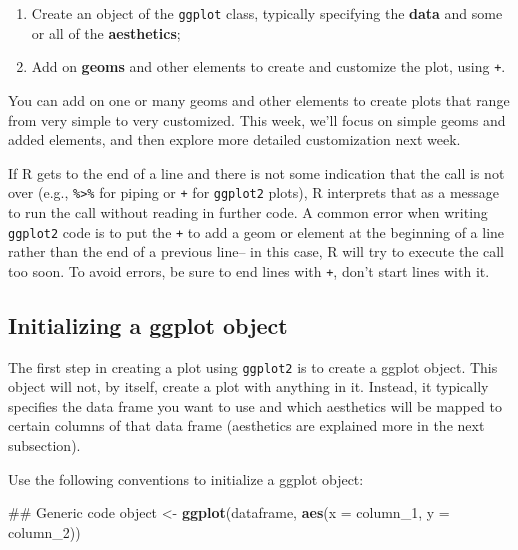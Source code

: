 \documentclass[]{book}
\makeatletter
\newenvironment{Shaded}{\begin{snugshade}}{\end{snugshade}}
\newcommand{\KeywordTok}[1]{\textcolor[rgb]{0.13,0.29,0.53}{\textbf{#1}}}
\newcommand{\DataTypeTok}[1]{\textcolor[rgb]{0.13,0.29,0.53}{#1}}
\newcommand{\DecValTok}[1]{\textcolor[rgb]{0.00,0.00,0.81}{#1}}
\newcommand{\StringTok}[1]{\textcolor[rgb]{0.31,0.60,0.02}{#1}}
\newcommand{\NormalTok}[1]{#1}
\providecommand{\tightlist}{%
  \setlength{\itemsep}{0pt}\setlength{\parskip}{0pt}}
\newenvironment{kframe}{%
\medskip{}
\setlength{\fboxsep}{.8em}
 \def\at@end@of@kframe{}%
 \ifinner\ifhmode%
  \def\at@end@of@kframe{\end{minipage}}%
  \begin{minipage}{\columnwidth}%
 \fi\fi%
 \def\FrameCommand##1{\hskip\@totalleftmargin \hskip-\fboxsep
 \colorbox{shadecolor}{##1}\hskip-\fboxsep
     \hskip-\linewidth \hskip-\@totalleftmargin \hskip\columnwidth}%
 \MakeFramed {\advance\hsize-\width
   \@totalleftmargin\z@ \linewidth\hsize
   \@setminipage}}%
 {\par\unskip\endMakeFramed%
 \at@end@of@kframe}
\renewenvironment{Shaded}{\begin{kframe}}{\end{kframe}}
\newenvironment{rmdblock}[1]
  {
  \begin{itemize}
  \renewcommand{\labelitemi}{
    \raisebox{-.7\height}[0pt][0pt]{
      {\setkeys{Gin}{width=3em,keepaspectratio}\texttt{[image: images/\#1]}}
    }
  }
  \setlength{\fboxsep}{1em}
  \begin{kframe}
  \item
  }
  {
  \end{kframe}
  \end{itemize}
  }
\newenvironment{rmdwarning}
  {\begin{rmdblock}{warning}}
  {\end{rmdblock}}
\theoremstyle{definition}
\theoremstyle{definition}
\theoremstyle{definition}
\theoremstyle{remark}
\makeatother
\begin{document}
\begin{enumerate}
\def\labelenumi{\arabic{enumi}.}
\tightlist
\item
  Create an object of the \texttt{ggplot} class, typically specifying
  the \textbf{data} and some or all of the \textbf{aesthetics};
\item
  Add on \textbf{geoms} and other elements to create and customize the
  plot, using \texttt{+}.
\end{enumerate}

You can add on one or many geoms and other elements to create plots that
range from very simple to very customized. This week, we'll focus on
simple geoms and added elements, and then explore more detailed
customization next week.

\begin{rmdwarning}
If R gets to the end of a line and there is not some indication that the
call is not over (e.g., \texttt{\%\textgreater{}\%} for piping or
\texttt{+} for \texttt{ggplot2} plots), R interprets that as a message
to run the call without reading in further code. A common error when
writing \texttt{ggplot2} code is to put the \texttt{+} to add a geom or
element at the beginning of a line rather than the end of a previous
line-- in this case, R will try to execute the call too soon. To avoid
errors, be sure to end lines with \texttt{+}, don't start lines with it.
\end{rmdwarning}

\subsection{Initializing a ggplot
object}\label{initializing-a-ggplot-object}

The first step in creating a plot using \texttt{ggplot2} is to create a
ggplot object. This object will not, by itself, create a plot with
anything in it. Instead, it typically specifies the data frame you want
to use and which aesthetics will be mapped to certain columns of that
data frame (aesthetics are explained more in the next subsection).

Use the following conventions to initialize a ggplot object:

\begin{Shaded}
\begin{Highlighting}[]
\NormalTok{## Generic code}
\NormalTok{object <-}\StringTok{ }\KeywordTok{ggplot}\NormalTok{(dataframe, }\KeywordTok{aes}\NormalTok{(}\DataTypeTok{x =}\NormalTok{ column_}\DecValTok{1}\NormalTok{, }\DataTypeTok{y =}\NormalTok{ column_}\DecValTok{2}\NormalTok{))}
\end{Highlighting}
\end{Shaded}
\end{document}
